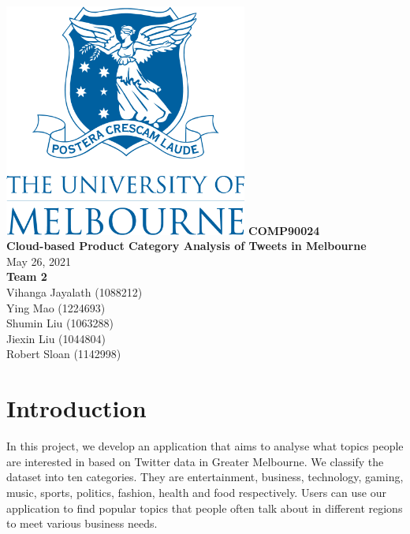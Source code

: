 \documentclass[parskip=full, 11pt]{article}
\begin{document}
\begin{titlepage}
	\centering
	\includegraphics[width=8cm]{Figures/UoM_logo.png}
	\vfill
	{
		\bfseries\Huge
		COMP90024 \\
		\vskip1cm
	}
	{
		\bfseries\huge
		Cloud-based Product Category Analysis of Tweets in Melbourne  \\
		\vskip1cm
	}	
	{	\Large
		May 26, 2021\\
		\vskip1cm
	}
	{
		\LARGE
		\textbf{Team 2} \\
		Vihanga Jayalath (1088212) \\
	    Ying Mao (1224693) \\
		Shumin Liu (1063288) \\
		Jiexin Liu (1044804) \\
		Robert Sloan (1142998) \\
	}
	\vfill
\end{titlepage}

\newpage

\tableofcontents

\newpage



\section{Introduction}
\label{sec:introduction}
In this project, we develop an application that aims to analyse what topics people are interested in based on Twitter data in Greater Melbourne. We classify the dataset into ten categories. They are entertainment, business, technology, gaming, music, sports, politics, fashion, health and food respectively. Users can use our application to find popular topics that people often talk about in different regions to meet various business needs. 
\end{document}
